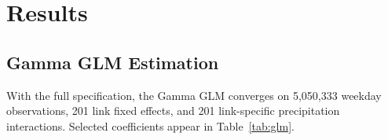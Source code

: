 \documentclass[review,authoryear]{elsarticle}
\begin{document}
\section{Results}
\label{sec:results}

\subsection{Gamma GLM Estimation}
\label{sec:results:glm}

With the full specification, the Gamma GLM converges on 5,050,333 weekday observations, 201 link fixed effects, and 201 link-specific precipitation interactions. Selected coefficients appear in Table~\ref{tab:glm}.
\end{document}
